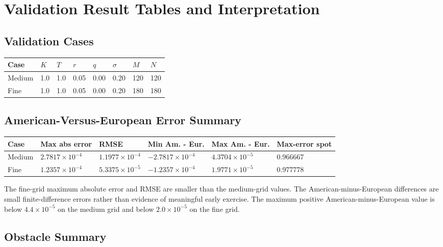 \documentclass[11pt,a4paper]{article}
\begin{document}
\section{Validation Result Tables and Interpretation}

\subsection{Validation Cases}

{\small
\begin{longtable}{@{}L{0.16\textwidth}L{0.07\textwidth}L{0.07\textwidth}L{0.07\textwidth}L{0.07\textwidth}L{0.09\textwidth}L{0.07\textwidth}L{0.07\textwidth}@{}}
\toprule
Case & \(K\) & \(T\) & \(r\) & \(q\) & \(\sigma\) & \(M\) & \(N\) \\
\midrule
\endhead
Medium & 1.0 & 1.0 & 0.05 & 0.00 & 0.20 & 120 & 120 \\
Fine & 1.0 & 1.0 & 0.05 & 0.00 & 0.20 & 180 & 180 \\
\bottomrule
\end{longtable}
}

\subsection{American-Versus-European Error Summary}

{\small
\begin{longtable}{@{}L{0.13\textwidth}L{0.16\textwidth}L{0.14\textwidth}L{0.14\textwidth}L{0.14\textwidth}L{0.12\textwidth}@{}}
\toprule
Case & Max abs error & RMSE & Min Am. - Eur. & Max Am. - Eur. & Max-error spot \\
\midrule
\endhead
Medium & \(2.7817\times10^{-4}\) & \(1.1977\times10^{-4}\) & \(-2.7817\times10^{-4}\) & \(4.3704\times10^{-5}\) & 0.966667 \\
Fine & \(1.2357\times10^{-4}\) & \(5.3375\times10^{-5}\) & \(-1.2357\times10^{-4}\) & \(1.9771\times10^{-5}\) & 0.977778 \\
\bottomrule
\end{longtable}
}

The fine-grid maximum absolute error and RMSE are smaller than the medium-grid values. The
American-minus-European differences are small finite-difference errors rather than evidence of
meaningful early exercise. The maximum positive American-minus-European value is below
\(4.4\times10^{-5}\) on the medium grid and below \(2.0\times10^{-5}\) on the fine grid.

\subsection{Obstacle Summary}
\end{document}
